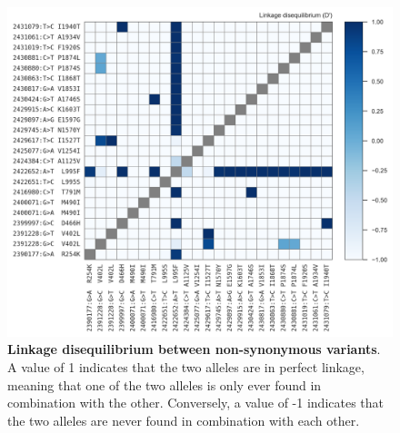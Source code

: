 \documentclass[a4paper,11pt,abstracton,hidelinks]{scrartcl}
\begin{document}
%
\begin{figure}[!t]

  \centering

  \includegraphics[width=\linewidth]{artwork/fig_ld.png}

  \caption{\textbf{Linkage disequilibrium between non-synonymous variants}. A value of 1 indicates that the two alleles are in perfect linkage, meaning that one of the two alleles is only ever found in combination with the other. Conversely, a value of -1 indicates that the two alleles are never found in combination with each other.}

  \label{fig:ld}

\end{figure}
\end{document}
